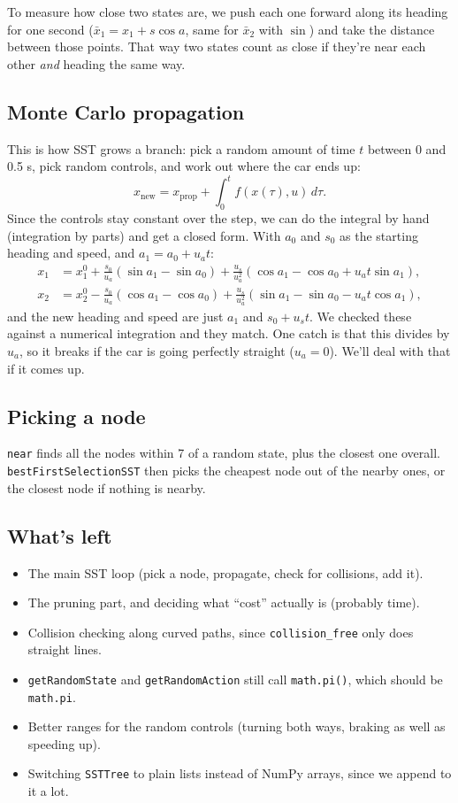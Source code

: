 \documentclass[11pt]{article}
\newcommand{\code}[1]{\texttt{#1}}
\begin{document}
To measure how close two states are, we push each one forward along its heading for one second
($\bar x_1 = x_1 + s\cos a$, same for $\bar x_2$ with $\sin$) and take the distance between those points.
That way two states count as close if they're near each other \emph{and} heading the same way.

\subsection{Monte Carlo propagation}
This is how SST grows a branch: pick a random amount of time $t$ between 0 and 0.5 s, pick random
controls, and work out where the car ends up:
\[
  x_{\text{new}} = x_{\text{prop}} + \int_0^t f(x(\tau), u)\, d\tau.
\]
Since the controls stay constant over the step, we can do the integral by hand (integration by parts) and
get a closed form. With $a_0$ and $s_0$ as the starting heading and speed, and $a_1 = a_0 + u_a t$:
\begin{align*}
  x_1 &= x_1^0 + \frac{s_0}{u_a}(\sin a_1 - \sin a_0) + \frac{u_s}{u_a^2}(\cos a_1 - \cos a_0 + u_a t \sin a_1), \\
  x_2 &= x_2^0 - \frac{s_0}{u_a}(\cos a_1 - \cos a_0) + \frac{u_s}{u_a^2}(\sin a_1 - \sin a_0 - u_a t \cos a_1),
\end{align*}
and the new heading and speed are just $a_1$ and $s_0 + u_s t$. We checked these against a numerical
integration and they match. One catch is that this divides by $u_a$, so it breaks if the car is going
perfectly straight ($u_a = 0$). We'll deal with that if it comes up.

\subsection{Picking a node}
\code{near} finds all the nodes within 7 of a random state, plus the closest one overall.
\code{bestFirstSelectionSST} then picks the cheapest node out of the nearby ones, or the closest node if
nothing is nearby.

\subsection{What's left}
\begin{itemize}
  \item The main SST loop (pick a node, propagate, check for collisions, add it).
  \item The pruning part, and deciding what ``cost'' actually is (probably time).
  \item Collision checking along curved paths, since \code{collision\_free} only does straight lines.
  \item \code{getRandomState} and \code{getRandomAction} still call \code{math.pi()}, which should be
    \code{math.pi}.
  \item Better ranges for the random controls (turning both ways, braking as well as speeding up).
  \item Switching \code{SSTTree} to plain lists instead of NumPy arrays, since we append to it a lot.
\end{itemize}
\end{document}
